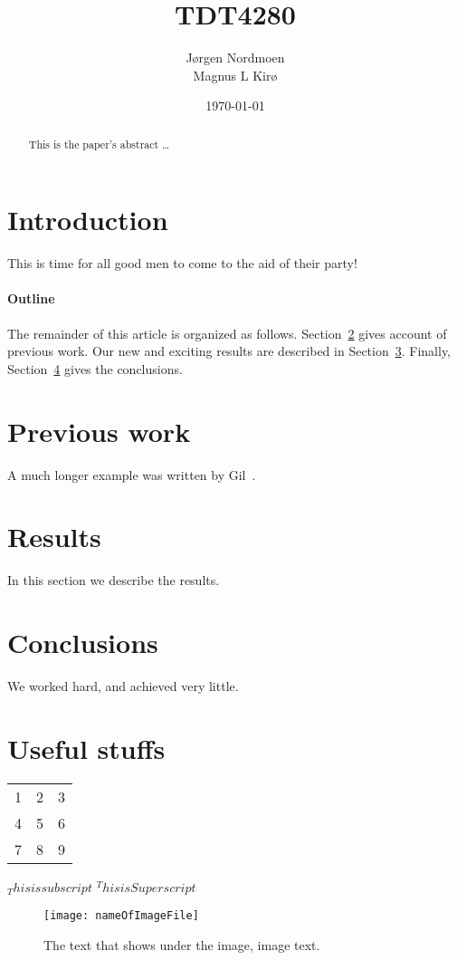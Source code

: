 \documentclass[12pt, a4paper]{article}
\title{TDT4280}
\author{
		Jørgen Nordmoen \\
        Magnus L Kirø \\
}
\date{\today}
\begin{document}
\maketitle
{}

\begin{abstract}
This is the paper's abstract \ldots
\end{abstract}

\section{Introduction}
This is time for all good men to come to the aid of their party!

\paragraph{Outline}
The remainder of this article is organized as follows.
Section~\ref{previous work} gives account of previous work.
Our new and exciting results are described in Section~\ref{results}.
Finally, Section~\ref{conclusions} gives the conclusions.

\section{Previous work}\label{previous work}
A much longer \LaTeXe{} example was written by Gil~\cite{Gil:02}.

\section{Results}\label{results}
In this section we describe the results.

\section{Conclusions}\label{conclusions}
We worked hard, and achieved very little.

\section{Useful stuffs}

\begin{tabular}{ l c r }
  1 & 2 & 3 \\
  4 & 5 & 6 \\
  7 & 8 & 9 \\
\end{tabular}

$_This is subscript$
$^This is Superscript$

\begin{figure}[htb]
    \centering
    \texttt{[image: nameOfImageFile]} 
    \caption{The text that shows under the image, image text.}
    \label{fig:FigureLableName}
\end{figure}




\end{document}
